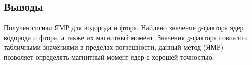 \subsection*{Выводы}


Получен сигнал ЯМР для водорода и фтора. 
Найдено значение $g$-фактора ядер водорода и фтора, а также их магнитный момент. Значения $g$-фактора совпало с табличными значениями в пределах погрешности, данный метод (ЯМР) позволяет определять магнитный момент ядер с хорошей точностью.


